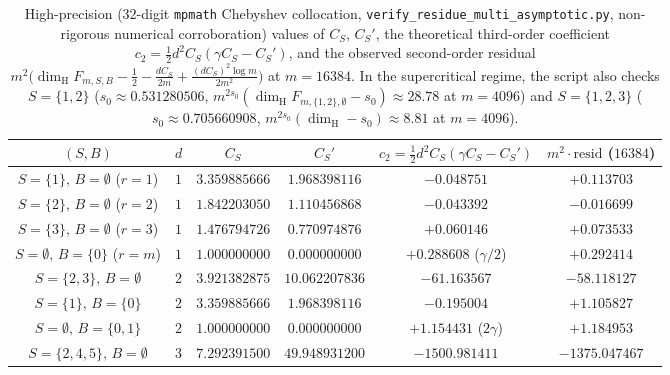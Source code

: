 \documentclass[11pt]{article}
\theoremstyle{definition}
\theoremstyle{remark}
\newcommand{\dimH}{\dim_{\mathrm{H}}}
\begin{document}
\begin{table}[ht]
\centering\small\setlength{\tabcolsep}{4.5pt}
\begin{tabular}{c|c|c|c|c|c}
$(S,B)$ & $d$ & $C_S$ & $C_S'$ & $c_2=\frac12 d^2 C_S(\gamma C_S-C_S')$ & $m^2\cdot\mathrm{resid}$ ($16384$) \\\hline
$S=\{1\},\,B=\emptyset$ ($r=1$) & $1$ & $3.359885666$ & $1.968398116$ & $-0.048751$ & $+0.113703$ \\
$S=\{2\},\,B=\emptyset$ ($r=2$) & $1$ & $1.842203050$ & $1.110456868$ & $-0.043392$ & $-0.016699$ \\
$S=\{3\},\,B=\emptyset$ ($r=3$) & $1$ & $1.476794726$ & $0.770974876$ & $+0.060146$ & $+0.073533$ \\
$S=\emptyset,\,B=\{0\}$ ($r=m$) & $1$ & $1.000000000$ & $0.000000000$ & $+0.288608$ ($\gamma/2$) & $+0.292414$ \\\hline
$S=\{2,3\},\,B=\emptyset$ & $2$ & $3.921382875$ & $10.062207836$ & $-61.163567$ & $-58.118127$ \\
$S=\{1\},\,B=\{0\}$ & $2$ & $3.359885666$ & $1.968398116$ & $-0.195004$ & $+1.105827$ \\
$S=\emptyset,\,B=\{0,1\}$ & $2$ & $1.000000000$ & $0.000000000$ & $+1.154431$ ($2\gamma$) & $+1.184953$ \\
$S=\{2,4,5\},\,B=\emptyset$ & $3$ & $7.292391500$ & $49.948931200$ & $-1500.981411$ & $-1375.047467$
\end{tabular}
\caption{High-precision ($32$-digit \texttt{mpmath} Chebyshev collocation, \texttt{verify\_\allowbreak residue\_\allowbreak multi\_\allowbreak asymptotic.py}, non-rigorous numerical corroboration) values of $C_S$, $C_S'$, the theoretical third-order coefficient $c_2=\frac12 d^2 C_S(\gamma C_S-C_S')$, and the observed second-order residual $m^2\bigl(\dimH F_{m,S,B}-\frac12-\frac{dC_S}{2m}+\frac{(dC_S)^2\log m}{2m^2}\bigr)$ at $m=16384$. In the supercritical regime, the script also checks $S=\{1,2\}$ ($s_0\approx0.531280506$, $m^{2s_0}(\dimH F_{m,\{1,2\},\emptyset}-s_0)\approx 28.78$ at $m=4096$) and $S=\{1,2,3\}$ ($s_0\approx0.705660908$, $m^{2s_0}(\dimH-s_0)\approx 8.81$ at $m=4096$).}\label{tab:multi-residue-asymptotic}
\end{table}
\end{document}
